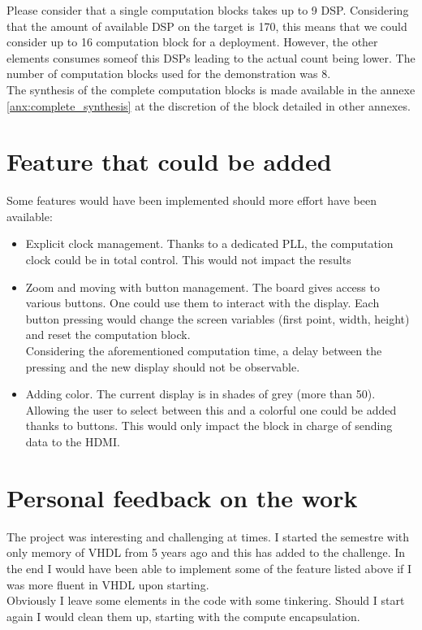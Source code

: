     Please consider that a single computation blocks takes up to 9 DSP.
    Considering that the amount of available DSP on the target is 170, this means that we could consider up to 16
    computation block for a deployment.
    However, the other elements consumes someof this DSPs leading to the actual count being lower.
    The number of computation blocks used for the demonstration was 8.\\
    The synthesis of the complete computation blocks is made available in the annexe \ref{anx:complete_synthesis} 
    at the discretion of the block detailed in other annexes.
\section{Feature that could be added}
    Some features would have been implemented should more effort have been available:
    \begin{itemize}
        \item Explicit clock management.
            Thanks to a dedicated PLL, the computation clock could be in total control.
            This would not impact the results
        \item Zoom and moving with button management.
            The board gives access to various buttons.
            One could use them to interact with the display.
            Each button pressing would change the screen variables (first point, width, height) and reset the
            computation block.\\
            Considering the aforementioned computation time, a delay between the pressing and the new display should
            not be observable.
        \item Adding color.
            The current display is in shades of grey (more than 50).
            Allowing the user to select between this and a colorful one could be added thanks to buttons.
            This would only impact the block in charge of sending data to the HDMI.
    \end{itemize}
\section{Personal feedback on the work}
    The project was interesting and challenging at times.
    I started the semestre with only memory of VHDL from 5 years ago and this has added to the challenge.
    In the end I would have been able to implement some of the feature listed above if I was more fluent in VHDL upon
    starting.\\
    Obviously I leave some elements in the code with some tinkering.
    Should I start again I would clean them up, starting with the compute encapsulation.
\label{page:end_redaction}
